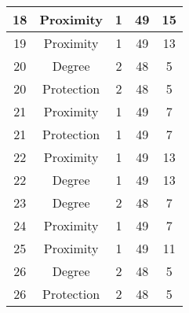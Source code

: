 \documentclass[results.tex]{subfiles}
\begin{document}
\begin{center}
\begin{tabular}{| c || c | c | c | c |}
            \hline
            18                      & Proximity                    & 1                      & 49                      & 15                   \\
            \hline
            19                      & Proximity                    & 1                      & 49                      & 13                   \\
            \hline
            20                      & Degree                       & 2                      & 48                      & 5                    \\
            \hline
            20                      & Protection                   & 2                      & 48                      & 5                    \\
            \hline
            21                      & Proximity                    & 1                      & 49                      & 7                    \\
            \hline
            21                      & Protection                   & 1                      & 49                      & 7                    \\
            \hline
            22                      & Proximity                    & 1                      & 49                      & 13                   \\
            \hline
            22                      & Degree                       & 1                      & 49                      & 13                   \\
            \hline
            23                      & Degree                       & 2                      & 48                      & 7                    \\
            \hline
            24                      & Proximity                    & 1                      & 49                      & 7                    \\
            \hline
            25                      & Proximity                    & 1                      & 49                      & 11                   \\
            \hline
            26                      & Degree                       & 2                      & 48                      & 5                    \\
            \hline
            26                      & Protection                   & 2                      & 48                      & 5                    \\

\end{tabular}
\end{center}
\end{document}
